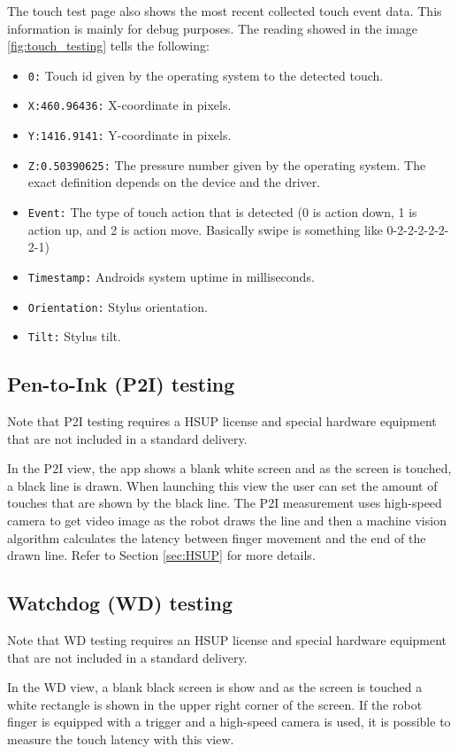 The touch test page also shows the most recent collected touch event data. This information is mainly for debug purposes. The reading showed in the image \ref{fig:touch_testing} tells the following:
\begin{itemize}
	\item \texttt{0:} Touch id given by the operating system to the detected touch. 
	\item \texttt{X:460.96436:} X-coordinate in pixels.
	\item \texttt{Y:1416.9141:} Y-coordinate in pixels.
	\item \texttt{Z:0.50390625:} The pressure number given by the operating system. The exact definition depends on the device and the driver.
	\item \texttt{Event:} The type of touch action that is detected (0 is action down, 1 is action up, and 2 is action move. Basically swipe is something like 0-2-2-2-2-2-2-1)
	\item \texttt{Timestamp:} Androids system uptime in milliseconds.
	\item \texttt{Orientation:} Stylus orientation.
	\item \texttt{Tilt:} Stylus tilt.
\end{itemize}


\subsection{Pen-to-Ink (P2I) testing}
\label{subsec:P2I}
Note that P2I testing requires a HSUP license and special hardware equipment that are not included in a standard delivery.

In the P2I view, the app shows a blank white screen and as the screen is touched, a black line is drawn. When launching this view the user can set the amount of touches that are shown by the black line. The P2I measurement uses high-speed camera to get video image as the robot draws the line and then a machine vision algorithm calculates the latency between finger movement and the end of the drawn line. Refer to Section \ref{sec:HSUP} for more details. 

\subsection{Watchdog (WD) testing}
\label{subsec:WD}
Note that WD testing requires an HSUP license and special hardware equipment that are not included in a standard delivery.

In the WD view, a blank black screen is show and as the screen is touched a white rectangle is shown in the upper right corner of the screen. If the robot finger is equipped with a trigger and a high-speed camera is used, it is possible to measure the touch latency with this view.

